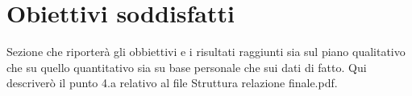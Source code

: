 \section{Obiettivi soddisfatti}

Sezione che riporterà gli obbiettivi e i risultati raggiunti sia sul piano qualitativo che su quello quantitativo sia su base personale che sui dati di fatto.
Qui descriverò il punto 4.a relativo al file Struttura relazione finale.pdf.


